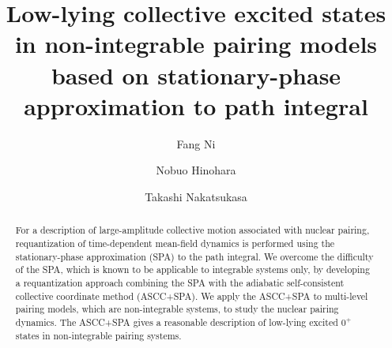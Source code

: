 \documentclass[%
superscriptaddress,
showpacs,
nofootinbib,
amsmath,amssymb,
aps,
prc,
twocolumn,
floatfix ]%
{revtex4-1}
\begin{document}
\renewcommand{\thefootnote}{\fnsymbol{footnote}}

\title{Low-lying collective excited states in non-integrable pairing models
based on stationary-phase approximation to path integral}%

\author{Fang Ni}
\author{Nobuo Hinohara}
\author{Takashi Nakatsukasa}

\begin{abstract}
For a description of large-amplitude collective motion associated with
nuclear pairing, requantization of time-dependent mean-field dynamics
is performed using the stationary-phase approximation (SPA) to the path
integral.
We overcome the difficulty of the SPA, which is known to be applicable to integrable systems only,
by developing a requantization approach combining the SPA with the adiabatic self-consistent collective coordinate method (ASCC+SPA).
We apply the ASCC+SPA to 
multi-level pairing models, which are non-integrable systems,
to study the nuclear pairing dynamics.
The ASCC+SPA gives a reasonable description of low-lying excited $0^+$
states in non-integrable pairing systems.
\end{abstract}
\end{document}
